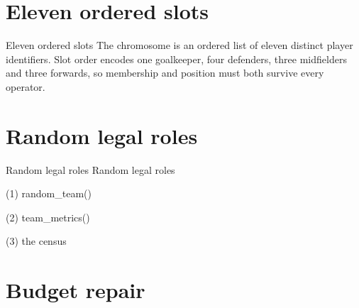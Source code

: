 \section{Eleven ordered slots}

\begin{frame}{Eleven ordered slots}
The chromosome is an ordered list of eleven distinct player identifiers. Slot
order encodes one goalkeeper, four defenders, three midfielders and three
forwards, so membership and position must both survive every operator.
\end{frame}


\section{Random legal roles}

\begin{frame}{Random legal roles}
Random legal roles
\end{frame}

\begin{frame}[fragile]{(1) random\_team()}

\end{frame}

\begin{frame}[fragile]{(2) team\_metrics()}

\end{frame}

\begin{frame}[fragile]{(3) the census}

\end{frame}


\section{Budget repair}

